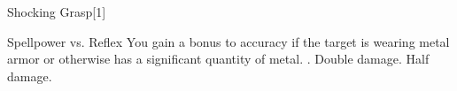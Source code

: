 \begin{spellsection}{Shocking Grasp}[1]
    \begin{spellheader}
    \end{spellheader}
    \begin{spellcontent}
        \begin{spelltargetinginfo}
        \end{spelltargetinginfo}
        \begin{spelleffects}
            \begin{spellattack}{Spellpower vs. Reflex}
                \spellspecial You gain a  bonus to accuracy if the target is wearing metal armor or otherwise has a significant quantity of metal.
                \spellsuccess {}.
                \spellcritical Double damage.
                \spellfailure Half damage.
            \end{spellattack}
        \end{spelleffects}
    \end{spellcontent}
    \begin{spellfooter}
        \miscastexplode
    \end{spellfooter}
    \begin{spellaugments}
    \end{spellaugments}
\end{spellsection}

